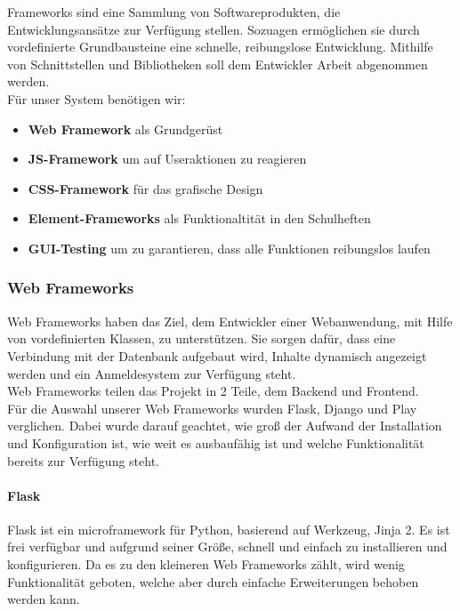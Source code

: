 
Frameworks sind eine Sammlung von Softwareprodukten, die Entwicklungsansätze zur Verfügung stellen. Sozuagen ermöglichen sie durch vordefinierte Grundbausteine eine schnelle, reibungslose Entwicklung. Mithilfe von Schnittstellen und Bibliotheken soll dem Entwickler Arbeit abgenommen werden.\\
Für unser System benötigen wir:
\begin{itemize}
\item \textbf{Web Framework} als Grundgerüst
\item \textbf{JS-Framework} um auf Useraktionen zu reagieren
\item \textbf{CSS-Framework} für das grafische Design
\item \textbf{Element-Frameworks} als Funktionaltität in den Schulheften
\item \textbf{GUI-Testing} um zu garantieren, dass alle Funktionen reibungslos laufen
\end{itemize}

\subsubsection{Web Frameworks}
Web Frameworks haben das Ziel, dem Entwickler einer Webanwendung, mit Hilfe von vordefinierten Klassen, zu unterstützen. Sie sorgen dafür, dass eine Verbindung mit der Datenbank aufgebaut wird, Inhalte dynamisch angezeigt werden und ein Anmeldesystem zur Verfügung steht.\\
Web Frameworks teilen das Projekt in 2 Teile, dem Backend und Frontend.\\
Für die Auswahl unserer Web Frameworks wurden Flask, Django und Play verglichen. Dabei wurde darauf geachtet, wie groß der Aufwand der Installation und Konfiguration ist, wie weit es ausbaufähig ist und welche Funktionalität bereits zur Verfügung steht.

\newpage

\paragraph{Flask}
\grqq{}Flask ist ein microframework für Python, basierend auf Werkzeug, Jinja 2.\grqq{}\cite{FLASK} Es ist frei verfügbar und aufgrund seiner Größe, schnell und einfach zu installieren und konfigurieren. Da es zu den kleineren Web Frameworks zählt, wird wenig Funktionalität geboten, welche aber durch einfache Erweiterungen behoben werden kann.\cite{FLASK}

